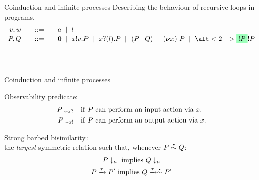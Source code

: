 \documentclass[aspectratio=169,hyperref={pdfpagelabels=false}]{beamer}
\begin{document}
\begin{frame}{Coinduction and infinite processes}
  {Describing the behaviour of recursive loops in programs.
\begin{displaymath}
  \begin{array}{r@{\qquad}c@{\qquad}l}
    v,w & ::= & a \ \mid\ l \\
    P,Q & ::= & \Pend
               \ \mid\ \Pout{x}{v}{P}
               \ \mid\  \Pin{x}{l}{P}
               \ \mid\  \PBpar{P}{Q}
               \ \mid\  \Pres{x}{}{P}
               \ \mid\  \alt<2->{\hg{!P}}{!P}
  \end{array}
\end{displaymath}}
  \ \\ \ \\

\end{frame}

\begin{frame}{Coinduction and infinite processes}

  Observability predicate:
  \begin{align*}
  P\downarrow_{x?}  &\quad \textrm{if \( P \) can perform an input action via \( x \).} \\
  P\downarrow_{x!} &\quad \textrm{if \( P \) can perform an output action via \( x \).}
  \end{align*}

  Strong barbed bisimilarity:\\
  \textrm{the \emph{largest} symmetric relation such that, whenever \( \sbbisim{P}{Q} \):}
\begin{gather}
  \observable{P}{\mu}~\textrm{implies}~\observable{Q}{\mu}\label{eq:bisim1} \\
  \transition{P}{\Atau}{P'}~\textrm{implies}~\transition{Q}{\Atau}{\sbbisim{}{} P'}%
\end{gather}
  

  


\end{frame}
\end{document}
